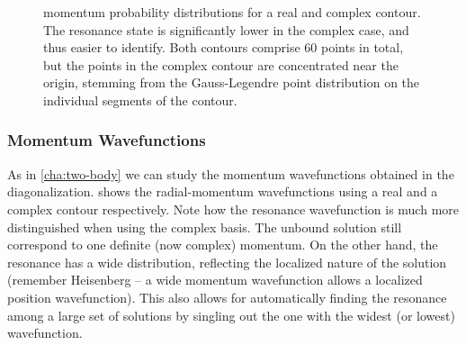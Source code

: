 \documentclass[../main/report.tex]{subfiles}
\begin{document}

\begin{figure}[t!]
\caption{ momentum probability distributions for a real and complex contour. The resonance state is significantly lower in the complex case, and thus easier to identify. Both contours comprise 60 points in total, but the points in the complex contour are concentrated near the origin, stemming from the Gauss-Legendre point distribution on the individual segments of the contour.} 
\label{fig:complex_mom_wavefunctions}
\end{figure}


\subsubsection{Momentum Wavefunctions}

As in \cref{cha:two-body} we can study the momentum wavefunctions obtained in the diagonalization.
 shows the radial-momentum wavefunctions using a real and a complex contour respectively.
Note how the resonance wavefunction is much more distinguished when using the complex basis.  
The unbound solution still correspond to one definite (now complex) momentum. 
On the other hand, the resonance has a wide distribution, reflecting the localized nature of the solution 
(remember Heisenberg -- a wide momentum wavefunction allows a localized position wavefunction). 
This also allows for automatically finding the resonance among a large set of solutions by singling out the one with the widest (or lowest) wavefunction.
\end{document}
